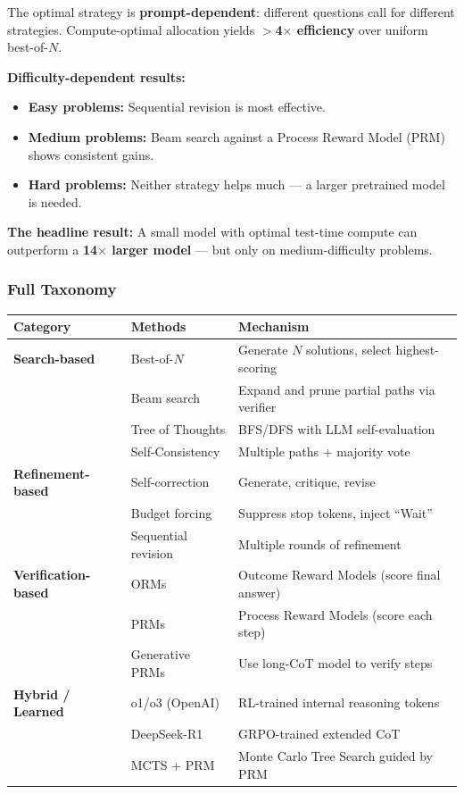 \documentclass[11pt, a4paper]{article}
\theoremstyle{definition}
\theoremstyle{plain}
\begin{document}
The optimal strategy is \textbf{prompt-dependent}: different questions call for different strategies. Compute-optimal allocation yields $>$\textbf{4$\times$ efficiency} over uniform best-of-$N$.

\textbf{Difficulty-dependent results:}
\begin{itemize}
  \item \textbf{Easy problems:} Sequential revision is most effective.
  \item \textbf{Medium problems:} Beam search against a Process Reward Model (PRM) shows consistent gains.
  \item \textbf{Hard problems:} Neither strategy helps much --- a larger pretrained model is needed.
\end{itemize}

\textbf{The headline result:} A small model with optimal test-time compute can outperform a \textbf{14$\times$ larger model} --- but only on medium-difficulty problems.

\subsubsection{Full Taxonomy}

\begin{center}
\begin{tabular}{p{3.5cm}lp{6cm}}
  \toprule
  \textbf{Category} & \textbf{Methods} & \textbf{Mechanism} \\
  \midrule
  \textbf{Search-based} & Best-of-$N$ & Generate $N$ solutions, select highest-scoring \\
  & Beam search & Expand and prune partial paths via verifier \\
  & Tree of Thoughts & BFS/DFS with LLM self-evaluation \\
  & Self-Consistency & Multiple paths + majority vote \\
  \midrule
  \textbf{Refinement-based} & Self-correction & Generate, critique, revise \\
  & Budget forcing & Suppress stop tokens, inject ``Wait'' \\
  & Sequential revision & Multiple rounds of refinement \\
  \midrule
  \textbf{Verification-based} & ORMs & Outcome Reward Models (score final answer) \\
  & PRMs & Process Reward Models (score each step) \\
  & Generative PRMs & Use long-CoT model to verify steps \\
  \midrule
  \textbf{Hybrid / Learned} & o1/o3 (OpenAI) & RL-trained internal reasoning tokens \\
  & DeepSeek-R1 & GRPO-trained extended CoT \\
  & MCTS + PRM & Monte Carlo Tree Search guided by PRM \\
  \bottomrule
\end{tabular}
\end{center}
\end{document}
